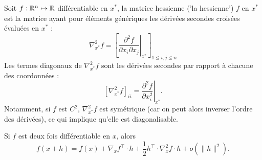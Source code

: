 \begin{definition}
  Soit $f : \mathbb{R}^n \mapsto \mathbb{R}$ différentiable en $x^*$, la matrice hessienne ('la hessienne') $f$ en $x^*$ est la matrice ayant pour éléments génériques les dérivées secondes croisées évaluées en $x^*$ : 
  $$
  \nabla^2_{x^*}f 
  = \left[\left.\frac{\partial^2 f}{\partial x_i\partial x_j}\right|_{x^*} \right]_{1 \leq i, j \leq n}
  $$
  Les termes diagonaux de $\nabla^2_{x^*}f$ sont les dérivées secondes par rapport à chacune des coordonnées : 
  $$
  \left[ \nabla^2_{x^*}f \right]_{ii} 
  = \left.\frac{\partial^2 f}{\partial x_i^2}\right|_{x^*}.
  $$
  Notamment, si $f$ est $C^2$, $\nabla^2_{x^*}f$ est symétrique (car on peut alors inverser l'ordre des dérivées), ce qui implique qu'elle est diagonalisable.
\end{definition}

\begin{proposition} \label{prop:taylorOrdre2}
  Si $f$ est deux fois différentiable en $x$, alors
  $$
  f(x+h) = f(x) + \nabla_x f^\top \cdot h + \frac12 h^\top \cdot \nabla^2_x f \cdot h + o(\|h\|^2).
  $$
\end{proposition}

